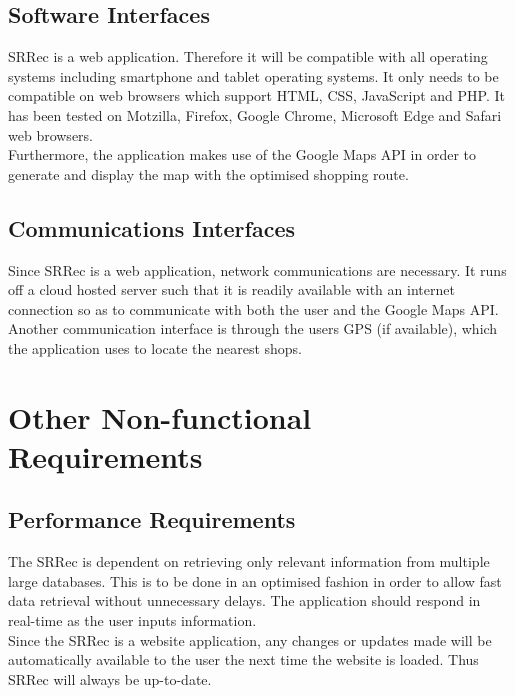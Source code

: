 \documentclass[10pt, a4paper, onecolumn]{scrartcl}
\begin{document}
		\subsection{Software Interfaces}
		
			SRRec is a web application. Therefore it will be compatible with all operating systems including smartphone and tablet operating systems. It only needs to be compatible on web browsers which support HTML, CSS, JavaScript and PHP. It has been tested on Motzilla, Firefox, Google Chrome, Microsoft Edge and Safari web browsers. \\
			
			Furthermore, the application makes use of the Google Maps API in order to generate and display the map with the optimised shopping route. 
		
		\subsection{Communications Interfaces}
		
			Since SRRec is a web application, network communications are necessary. It runs off a cloud hosted server such that it is readily available with an internet connection so as to communicate with both the user and the Google Maps API. Another communication interface is through the users GPS (if available), which the application uses to locate the nearest shops.
	
	\section{Other Non-functional Requirements}
	
		\subsection{Performance Requirements}
		
			The SRRec is dependent on retrieving only relevant information from multiple large databases. This is to be done in an optimised fashion in order to allow fast data retrieval without unnecessary delays. The application should respond in real-time as the user inputs information.\\
		
			Since the SRRec is a website application, any changes or updates made will be automatically available to the user the next time the website is loaded. Thus SRRec will always be up-to-date.\\
		
\end{document}
